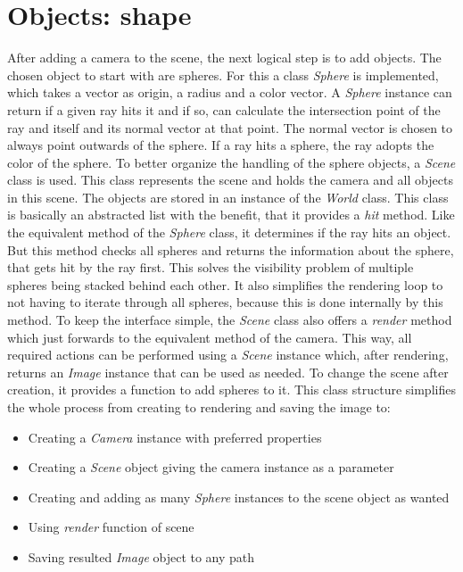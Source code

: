 \documentclass[12pt]{report}
\begin{document}
\chapter{Objects: shape}
After adding a camera to the scene, the next logical step is to add objects. The chosen object to start with are spheres. For this a class \textit{Sphere} is implemented, which takes a vector as origin, a radius and a color vector. A \textit{Sphere} instance can return if a given ray hits it and if so, can calculate the intersection point of the ray and itself and its normal vector at that point. The normal vector is chosen to always point outwards of the sphere. If a ray hits a sphere, the ray adopts the color of the sphere. To better organize the handling of the sphere objects, a \textit{Scene} class is used. This class represents the scene and holds the camera and all objects in this scene. The objects are stored in an instance of the \textit{World} class. This class is basically an abstracted list with the benefit, that it provides a \textit{hit} method. Like the equivalent method of the \textit{Sphere} class, it determines if the ray hits an object. But this method checks all spheres and returns the information about the sphere, that gets hit by the ray first. This solves the visibility problem of multiple spheres being stacked behind each other. It also simplifies the rendering loop to not having to iterate through all spheres, because this is done internally by this method. To keep the interface simple, the \textit{Scene} class also offers a \textit{render} method which just forwards to the equivalent method of the camera. This way, all required actions can be performed using a \textit{Scene} instance which, after rendering, returns an \textit{Image} instance that can be used as needed. To change the scene after creation, it provides a function to add spheres to it. This class structure simplifies the whole process from creating to rendering and saving the image to:
\begin{itemize}
\item Creating a \textit{Camera} instance with preferred properties
\item Creating a \textit{Scene} object giving the camera instance as a parameter
\item Creating and adding as many \textit{Sphere} instances to the scene object as wanted
\item Using \textit{render} function of scene
\item Saving resulted \textit{Image} object to any path
\end{itemize}
\end{document}
